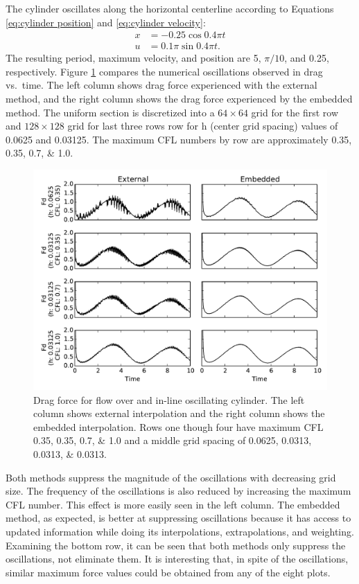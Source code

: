 \documentclass[preprint,12pt,5p]{elsarticle}
\begin{document}
The cylinder oscillates along the horizontal centerline according to Equations \eqref{eq:cylinder position} and \eqref{eq:cylinder velocity}:
\begin{align}
x&=-0.25\cos{0.4\pi t}\label{eq:cylinder position}\\
u&=0.1\pi\sin{0.4\pi t}.\;\label{eq:cylinder velocity}
\end{align}
The resulting period, maximum velocity, and position are 5, $\pi/10$, and 0.25, respectively. 
Figure \ref{fig:osccylinder} compares the numerical oscillations observed in drag vs.~time. 
The left column shows drag force experienced with the external method, and the right column shows the drag force experienced by the embedded method.
The uniform section is discretized into a $64 \times 64$ grid for the first row and $ 128 \times 128$ grid for last three rows row for h (center grid spacing) values of 0.0625 and 0.03125. 
The maximum CFL numbers by row are approximately \numlist{0.35; 0.35; 0.7; 1.0}.
\begin{figure}[!htb]
	\centering
	\includegraphics[width=\textwidth]{osc_cylinder}
	\caption{Drag force for flow over and in-line oscillating cylinder. The left column shows external interpolation and the right column shows the embedded interpolation. Rows one though four have maximum CFL \numlist{0.35; 0.35; 0.7; 1.0} and a middle grid spacing of \numlist{0.0625; 0.0313; 0.0313; 0.0313}.}
	\label{fig:osccylinder}
\end{figure}

Both methods suppress the magnitude of the oscillations with decreasing grid size. 
The frequency of the oscillations is also reduced by increasing the maximum CFL number. 
This effect is more easily seen in the left column. 
The embedded method, as expected, is better at suppressing oscillations because it has access to updated information while doing its interpolations, extrapolations, and weighting.  
Examining the bottom row, it can be seen that both methods only suppress the oscillations, not eliminate them. 
It is interesting that, in spite of the oscillations, similar maximum force values could be obtained from any of the eight plots. 
\end{document}
